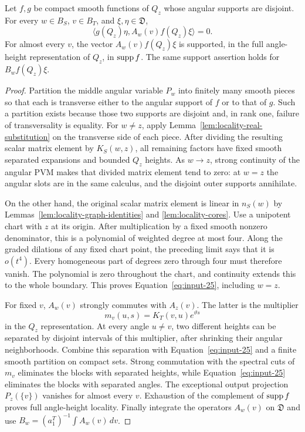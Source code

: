 \begin{lemma}
\label{lem:locality-support}
Let $f,g$ be compact smooth functions of $Q_z$ whose angular
supports are disjoint.  For every $w\in B_S$, $v\in B_T$, and
$\xi,\eta\in\mathfrak D$,
\begin{equation}
 \langle g(Q_z)\eta,A_w(v)f(Q_z)\xi\rangle=0.
 \label{eq:input-25}
\end{equation}
For almost every $v$, the vector $A_w(v)f(Q_z)\xi$ is supported, in
the full angle-height representation of $Q_z$, in $\operatorname{supp} f$.
The same support assertion holds for $B_wf(Q_z)\xi$.
\end{lemma}

\begin{proof}
Partition the middle angular variable $P_w$ into finitely many
smooth pieces so that each is transverse either to the angular
support of $f$ or to that of $g$.  Such a partition exists because
those two supports are disjoint and, in rank one, failure of
transversality is equality.  For $w\ne z$, apply
Lemma~\ref{lem:locality-real-substitution} on the transverse side of
each piece.  After dividing the resulting scalar matrix element by
$K_S(w,z)$, all remaining factors have fixed smooth separated
expansions and bounded $Q_z$ heights.  As $w\to z$, strong
continuity of the angular PVM makes that divided matrix element
tend to zero: at $w=z$ the angular slots are in the same calculus,
and the disjoint outer supports annihilate.

On the other hand, the original scalar matrix element is linear in
$n_S(w)$ by Lemmas~\ref{lem:locality-graph-identities} and
\ref{lem:locality-cores}.  Use a unipotent chart with $z$ at its
origin.  After multiplication by a fixed smooth nonzero
denominator, this is a polynomial of weighted degree at most four.
Along the graded dilations of any fixed chart point, the preceding
limit says that it is $o(t^4)$.  Every homogeneous part of degrees
zero through four must therefore vanish.  The polynomial is zero
throughout the chart, and continuity extends this to the whole
boundary.  This proves Equation~\eqref{eq:input-25}, including
$w=z$.

For fixed $v$, $A_w(v)$ strongly commutes with $A_z(v)$.  The latter
is the multiplier
\[
 m_v(u,s)=K_T(v,u)e^{\vartheta s}
\]
in the $Q_z$ representation.  At every angle $u\ne v$, two different
heights can be separated by disjoint intervals of this multiplier,
after shrinking their angular neighborhoods.  Combine this
separation with Equation~\eqref{eq:input-25} and a finite smooth
partition on compact sets.  Strong commutation with the spectral
cuts of $m_v$ eliminates the blocks with separated heights, while
Equation~\eqref{eq:input-25} eliminates the blocks with separated
angles.  The exceptional output projection $P_z(\{v\})$ vanishes
for almost every $v$.  Exhaustion of the complement of $\operatorname{supp} f$
proves full angle-height locality.  Finally integrate the operators
$A_w(v)$ on $\mathfrak D$ and use
$B_w=(a_1^T)^{-1}\int A_w(v)\,dv$.
\end{proof}

